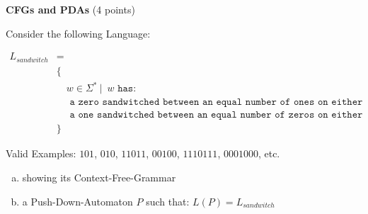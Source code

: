 \documentclass[12pt]{article}
\newenvironment{question}[2][Question]{\begin{trivlist}
\item[\hskip \labelsep {\bfseries #1}\hskip \labelsep {\bfseries #2.}]}{\end{trivlist}}
\begin{document}
\clearpage

\begin{question}{3}\textbf{CFGs and PDAs} (4 points)

Consider the following Language:

\begin{align*}
L_{sandwitch} &= \\
&\{\\
& \quad w \in \Sigma^* \ \vert \;  \ w  \texttt{ has: } \\
& \quad \texttt{ a zero sandwitched between an equal number of ones on either side or} \\
& \quad \texttt{ a one sandwitched between an equal number of zeros on either side}\\
&\}
\end{align*}

Valid Examples: $101$, $010$, $11011$, $00100$, $1110111$, $0001000$, etc.

\begin{enumerate}[a)]
    \item showing its Context-Free-Grammar
 \vspace{10em}

    \item a Push-Down-Automaton $P$ such that: $L(P) = L_{sandwitch}$
     \vspace{10em}
\end{enumerate}




\vspace{13em}

\end{question}


\newpage
\end{document}
